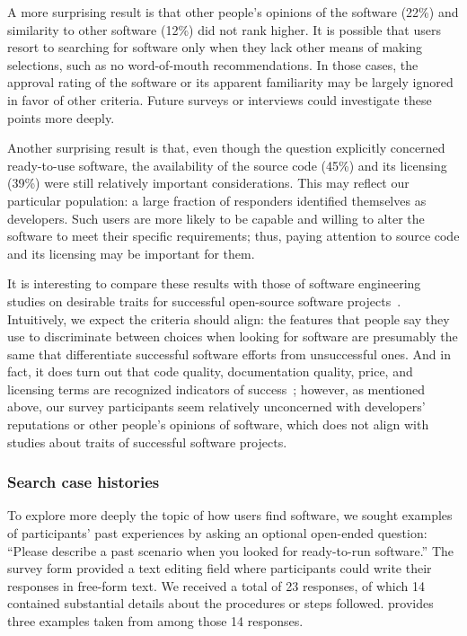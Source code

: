 \documentclass{casicswhitepaper}
\begin{document}
A more surprising result is that other people's opinions of the software (22\%) and similarity to other software (12\%) did not rank higher.  It is possible that users resort to searching for software only when they lack other means of making selections, such as no word-of-mouth recommendations. In those cases, the approval rating of the software or its apparent familiarity may be largely ignored in favor of other criteria.  Future surveys or interviews could investigate these points more deeply.

Another surprising result is that, even though the question explicitly concerned ready-to-use software, the availability of the source code (45\%) and its licensing (39\%) were still relatively important considerations. This may reflect our particular population: a large fraction of responders identified themselves as developers. Such users are more likely to be capable and willing to alter the software to meet their specific requirements; thus, paying attention to source code and its licensing may be important for them.

It is interesting to compare these results with those of software engineering studies on desirable traits for successful open-source software projects~\cite[e.g.,][]{subramaniam2009determinants, lee2009measuring, crowston2003defining, crowston2006information, sen2012open, lee2009measuring}.  Intuitively, we expect the criteria should align: the features that people say they use to discriminate between choices when looking for software are presumably the same that differentiate successful software efforts from unsuccessful ones.  And in fact, it does turn out that code quality, documentation quality, price, and licensing terms are recognized indicators of success~\cite{subramaniam2009determinants, lee2009measuring, crowston2003defining, crowston2006information}; however, as mentioned above, our survey participants seem relatively unconcerned with developers' reputations or other people's opinions of software, which does not align with studies about traits of successful software projects.


\subsubsection{Search case histories}

To explore more deeply the topic of how users find software, we sought examples of participants' past experiences by asking an optional open-ended question: ``Please describe a past scenario when you looked for ready-to-run software.''  The survey form provided a text editing field where participants could write their responses in free-form text.  We received a total of 23 responses, of which 14 contained substantial details about the procedures or steps followed.   provides three examples taken from among those 14 responses.
\end{document}
